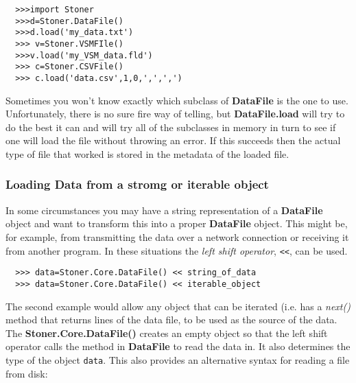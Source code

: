 \documentclass[a4paper,11pt]{scrartcl}
\begin{document}
\begin{verbatim}
  >>>import Stoner
  >>>d=Stoner.DataFile()
  >>>d.load('my_data.txt')
  >>> v=Stoner.VSMFIle()
  >>>v.load('my_VSM_data.fld')
  >>> c=Stoner.CSVFile()
  >>> c.load('data.csv',1,0,',',',')
\end{verbatim}


Sometimes you won't know exactly which subclass of \textbf{DataFile} is the one to use. Unfortunately, there is no sure fire way of telling, but \textbf{DataFile.load} will try to do the best it can and will try all of the subclasses in memory in turn to see if one will load the file without throwing an error. If this succeeds then the actual type of file that worked is stored in the metadata of the loaded file.


\subsubsection{Loading Data from a stromg or iterable object}

In some circumstances you may have a string representation of a \textbf{DataFile} object and want to transform this into a proper \textbf{DataFile} object.
This might be, for example, from transmitting the data over a network connection or receiving it from another program. In these situations the \textit{left shift operator}, \verb#<<#, can be used.

\begin{verbatim}
  >>> data=Stoner.Core.DataFile() << string_of_data
  >>> data=Stoner.Core.DataFile() << iterable_object
\end{verbatim}

The second example would allow any object that can be iterated (i.e. has a \textit{next()} method that returns lines of the data file, to be used
as the source of the data. The \textbf{Stoner.Core.DataFile()} creates an empty object so that the left shift operator calls the method
in \textbf{DataFile} to read the data in. It also determines the type of the object \verb#data#. This also provides an alternative syntax for reading a file
from disk:
\end{document}
